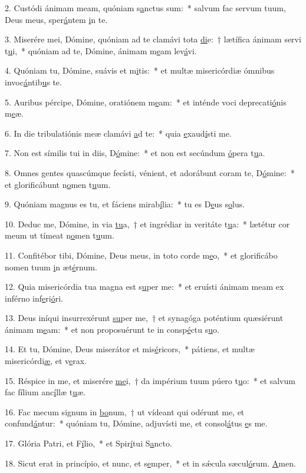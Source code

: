 2. Custódi ánimam meam, quóniam s\uline{a}nctus sum:~* salvum fac servum tuum, Deus meus, sper\uline{á}ntem \uline{i}n te.\par 
3. Miserére mei, Dómine, quóniam ad te clamávi tota \uline{di}e:~† lætífica ánimam servi t\uline{u}i,~* quóniam ad te, Dómine, ánimam m\uline{e}am lev\uline{á}vi.\par 
4. Quóniam tu, Dómine, suávis et m\uline{i}tis:~* et multæ misericórdiæ ómnibus invoc\uline{á}ntib\uline{u}s te.\par 
5. Auribus pércipe, Dómine, oratiónem m\uline{e}am:~* et inténde voci deprecati\uline{ó}nis m\uline{e}æ.\par 
6. In die tribulatiónis meæ clamávi \uline{a}d te:~* quia \uline{e}xaud\uline{í}sti me.\par 
7. Non est símilis tui in diis, D\uline{ó}mine:~* et non est secúndum \uline{ó}pera t\uline{u}a.\par 
8. Omnes gentes quascúmque fecísti, vénient, et adorábunt coram te, D\uline{ó}mine:~* et glorificábunt n\uline{o}men t\uline{u}um.\par 
9. Quóniam magnus es tu, et fáciens mirab\uline{í}lia:~* tu es D\uline{e}us s\uline{o}lus.\par 
10. Deduc me, Dómine, in via \uline{tu}a,~† et ingrédiar in veritáte t\uline{u}a:~* lætétur cor meum ut tímeat n\uline{o}men t\uline{u}um.\par 
11. Confitébor tibi, Dómine, Deus meus, in toto corde m\uline{e}o,~* et glorificábo nomen tuum \uline{i}n æt\uline{é}rnum.\par 
12. Quia misericórdia tua magna est s\uline{u}per me:~* et eruísti ánimam meam ex inférno inf\uline{e}ri\uline{ó}ri.\par 
13. Deus iníqui insurrexérunt \uline{su}per me,~† et synagóga poténtium quæsiérunt ánimam m\uline{e}am:~* et non proposuérunt te in consp\uline{é}ctu s\uline{u}o.\par 
14. Et tu, Dómine, Deus miserátor et mis\uline{é}ricors,~* pátiens, et multæ misericórdi\uline{æ}, et v\uline{e}rax.\par 
15. Réspice in me, et miserére \uline{me}i,~† da impérium tuum púero t\uline{u}o:~* et salvum fac fílium anc\uline{í}llæ t\uline{u}æ.\par 
16. Fac mecum signum in \uline{bo}num,~† ut vídeant qui odérunt me, et confund\uline{á}ntur:~* quóniam tu, Dómine, adjuvísti me, et consol\uline{á}tus \uline{e}s me.\par 
17. Glória Patri, et F\uline{í}lio,~* et Spir\uline{í}tui S\uline{a}ncto.\par 
18. Sicut erat in princípio, et nunc, et s\uline{e}mper,~* et in sǽcula sæcul\uline{ó}rum. \uline{A}men.\par 
